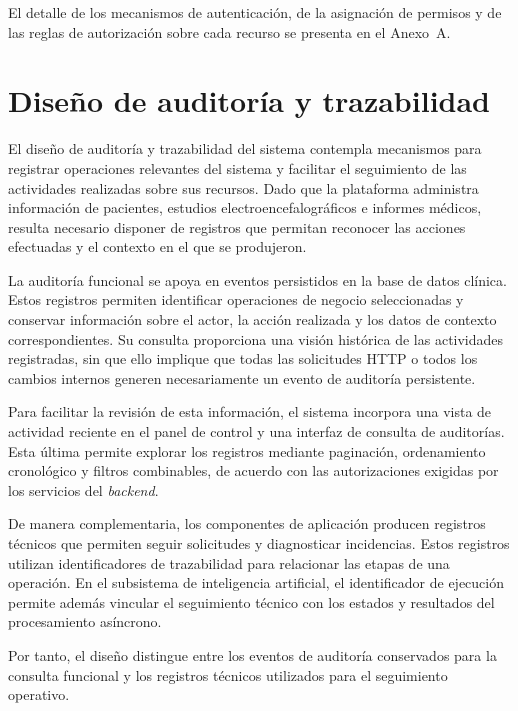 \begin{nuevotexto}
El detalle de los mecanismos de autenticación, de la asignación de permisos y de las reglas de autorización sobre cada recurso se presenta en el Anexo~A.
\end{nuevotexto}

\section{Diseño de auditoría y trazabilidad}
\label{sec:diseno-auditoria-trazabilidad}

El diseño de auditoría y trazabilidad del sistema contempla mecanismos para registrar operaciones relevantes del sistema y facilitar el seguimiento de las actividades realizadas sobre sus recursos. Dado que la plataforma administra información de pacientes, estudios electroencefalográficos e informes médicos, resulta necesario disponer de registros que permitan reconocer las acciones efectuadas y el contexto en el que se produjeron.

La auditoría funcional se apoya en eventos persistidos en la base de datos clínica. Estos registros permiten identificar operaciones de negocio seleccionadas y conservar información sobre el actor, la acción realizada y los datos de contexto correspondientes. Su consulta proporciona una visión histórica de las actividades registradas, sin que ello implique que todas las solicitudes HTTP o todos los cambios internos generen necesariamente un evento de auditoría persistente.

Para facilitar la revisión de esta información, el sistema incorpora una vista de actividad reciente en el panel de control y una interfaz de consulta de auditorías. Esta última permite explorar los registros mediante paginación, ordenamiento cronológico y filtros combinables, de acuerdo con las autorizaciones exigidas por los servicios del \textit{backend}.

De manera complementaria, los componentes de aplicación producen registros técnicos que permiten seguir solicitudes y diagnosticar incidencias. Estos registros utilizan identificadores de trazabilidad para relacionar las etapas de una operación. En el subsistema de inteligencia artificial, el identificador de ejecución permite además vincular el seguimiento técnico con los estados y resultados del procesamiento asíncrono.

Por tanto, el diseño distingue entre los eventos de auditoría conservados para la consulta funcional y los registros técnicos utilizados para el seguimiento operativo.

